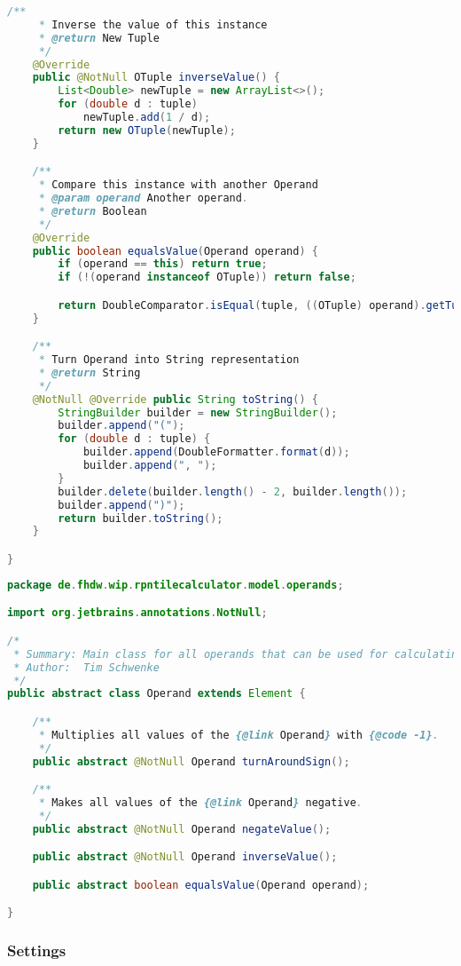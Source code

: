 \begin{lstlisting}[caption=OTuple (Schwenke),label=list:OTuple,language=Java]
    /**
     * Inverse the value of this instance
     * @return New Tuple
     */
    @Override
    public @NotNull OTuple inverseValue() {
        List<Double> newTuple = new ArrayList<>();
        for (double d : tuple)
            newTuple.add(1 / d);
        return new OTuple(newTuple);
    }

    /**
     * Compare this instance with another Operand
     * @param operand Another operand.
     * @return Boolean
     */
    @Override
    public boolean equalsValue(Operand operand) {
        if (operand == this) return true;
        if (!(operand instanceof OTuple)) return false;

        return DoubleComparator.isEqual(tuple, ((OTuple) operand).getTuple());
    }

    /**
     * Turn Operand into String representation
     * @return String
     */
    @NotNull @Override public String toString() {
        StringBuilder builder = new StringBuilder();
        builder.append("(");
        for (double d : tuple) {
            builder.append(DoubleFormatter.format(d));
            builder.append(", ");
        }
        builder.delete(builder.length() - 2, builder.length());
        builder.append(")");
        return builder.toString();
    }

}
\end{lstlisting}    

\begin{lstlisting}[caption=Operand (Schwenke),label=list:Operand,language=Java]
package de.fhdw.wip.rpntilecalculator.model.operands;

import org.jetbrains.annotations.NotNull;

/*
 * Summary: Main class for all operands that can be used for calculating
 * Author:  Tim Schwenke
 */
public abstract class Operand extends Element {

    /**
     * Multiplies all values of the {@link Operand} with {@code -1}.
     */
    public abstract @NotNull Operand turnAroundSign();

    /**
     * Makes all values of the {@link Operand} negative.
     */
    public abstract @NotNull Operand negateValue();

    public abstract @NotNull Operand inverseValue();

    public abstract boolean equalsValue(Operand operand);

}
\end{lstlisting}    

\subsubsection{Settings}

